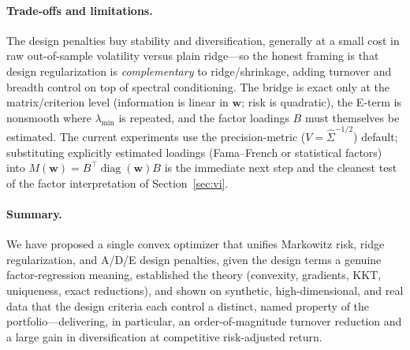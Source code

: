 \documentclass[11pt]{article}
\newcommand{\Sighat}{\hat\Sigma}
\newcommand{\diag}{\operatorname{diag}}
\newcommand{\w}{\mathbf{w}}
\newcommand{\M}{M(\w)}
\newcommand{\lammin}{\lambda_{\min}}
\begin{document}
\paragraph{Trade-offs and limitations.} The design penalties buy stability and
diversification, generally at a small cost in raw out-of-sample volatility versus
plain ridge---so the honest framing is that design regularization is
\emph{complementary} to ridge/shrinkage, adding turnover and breadth control on
top of spectral conditioning. The bridge is exact only at the matrix/criterion
level (information is linear in $\w$; risk is quadratic), the E-term is nonsmooth
where $\lammin$ is repeated, and the factor loadings $B$ must themselves be
estimated. The current experiments use the precision-metric ($V=\Sighat^{-1/2}$)
default; substituting explicitly estimated loadings (Fama--French or statistical
factors) into $\M=B^\top\diag(\w)B$ is the immediate next step and the cleanest
test of the factor interpretation of Section~\ref{sec:vi}.

\paragraph{Summary.} We have proposed a single convex optimizer that unifies
Markowitz risk, ridge regularization, and A/D/E design penalties, given the
design terms a genuine factor-regression meaning, established the theory
(convexity, gradients, KKT, uniqueness, exact reductions), and shown on synthetic,
high-dimensional, and real data that the design criteria each control a distinct,
named property of the portfolio---delivering, in particular, an order-of-magnitude
turnover reduction and a large gain in diversification at competitive
risk-adjusted return.



\end{document}
